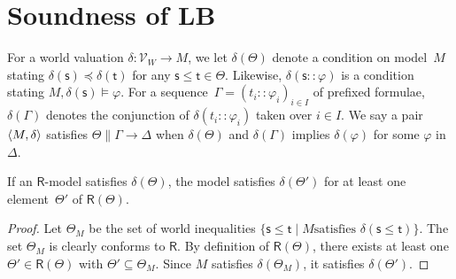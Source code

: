   \section{Soundness of LB}

  For a world valuation $\delta:\mathcal V_W\longrightarrow M$,
  we let $\delta(\Theta)$ denote a condition on
  model~$M$ stating $\delta(\mathsf s)\preceq \delta(\mathsf t)$ for any
  $\mathsf s\le \mathsf t\in\Theta$.
  Likewise, $\delta(\mathsf s::\varphi)$ is a condition stating
  $M,\delta(\mathsf s)\models\varphi$.  For a sequence~$\Gamma =
  (t_i::\varphi_i)_{i\in I}$ of
  prefixed formulae, $\delta(\Gamma)$ denotes the conjunction
  of $\delta(t_i::\varphi_i)$ taken over $i\in I$.
   We say a pair
   $\langle{M,\delta}\rangle$ satisfies
   $\Theta\parallel\Gamma\longrightarrow\Delta$ when $\delta(\Theta)$ and
   $\delta(\Gamma)$ implies $\delta(\varphi)$ for some $\varphi$
   in~$\Delta$.

   \begin{proposition}
    \label{exp-sound}
    If an $\mathsf R$-model satisfies $\delta(\Theta)$,
    the model satisfies $\delta(\Theta')$ for
    at least one element~$\Theta'$ of $\mathsf R(\Theta)$.
   \end{proposition}
   \begin{proof}
    Let $\Theta_M$ be the set of world inequalities
    $\{\mathsf s\le \mathsf t\mid M\mbox{
    satisfies }\delta(\mathsf s\le \mathsf t)\}$.
    The set $\Theta_M$ is clearly conforms to $\mathsf R$.
    By definition of $\mathsf R(\Theta)$, there exists at least one $\Theta'\in
    \mathsf R(\Theta)$ with $\Theta'\subseteq \Theta_M$.
    Since $M$ satisfies $\delta(\Theta_M)$, it satisfies $\delta(\Theta')$.
   \end{proof}

